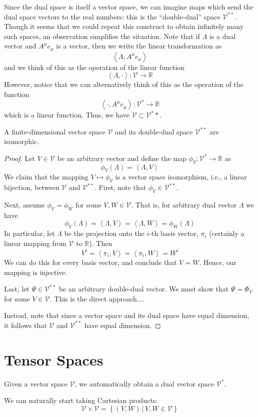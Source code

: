 Since the dual space is itself a vector space, we can imagine maps which send the dual space vectors to the real numbers: this is the ``double-dual'' space $\mathcal{V}^{**}$. Though it seems that we could repeat this construct to obtain infinitely many such spaces, an observation simplifies the situation. Note that if $\Lambda$ is a dual vector and $A^{\mu}e_{\mu}$ is a vector, then we write the linear transformation as \[ \left\langle \Lambda, A^{\mu}e_{\mu}\right\rangle \] and we think of this as the operation of the linear function \[ \left\langle \Lambda, \cdot \right\rangle : \mathcal{V} \rightarrow \mathbb{R} \] However, notice that we can alternatively think of this as the operation of the function \[ \left\langle \cdot, A^{\mu}e_{\mu} \right\rangle: \mathcal{V}^* \rightarrow \mathbb{R} \] which is a linear function. Thus, we have $\mathcal{V} \subset \mathcal{V}^**$.

\begin{theorem}
A finite-dimensional vector space $\mathcal{V}$ and its double-dual space $\mathcal{V}^{**}$ are isomorphic.
\end{theorem}
\begin{proof}
Let $V\in \mathcal{V}$ be an arbitrary vector and define the map $\phi_V: \mathcal{V}^* \rightarrow \mathbb{R}$ as \[ \phi_{V} \left(\Lambda\right) = \left\langle \Lambda, V \right\rangle \] We claim that the mapping $V \mapsto \phi_V$ is a vector space isomorphism, i.e., a linear bijection, between $\mathcal{V}$ and $\mathcal{V}^{**}$. First, note that $\phi_V \in \mathcal{V}^{**}$.

Next, assume $\phi_V = \phi_W$ for some $V, W \in \mathcal{V}$. That is, for arbitrary dual vector $\Lambda$ we have \[ \phi_V\left(\Lambda\right) = \left\langle \Lambda, V \right\rangle = \left\langle \Lambda, W \right\rangle = \phi_W\left(\Lambda\right) \] In particular, let $\Lambda$ be the projection onto the $i$-th basis vector, $\pi_i$ (certainly a linear mapping from $\mathcal{V}$ to $\mathbb{R}$). Then \[ V^i = \left\langle \pi_i, V\right\rangle = \left\langle \pi_i, W\right\rangle = W^i \] We can do this for every basis vector, and conclude that $V=W$. Hence, our mapping is injective.

Last, let $\Psi \in \mathcal{V}^{**}$ be an arbitrary double-dual vector. We must show that $\Psi = \Phi_V$ for some $V \in \mathcal{V}$. This is the direct approach....

Instead, note that since a vector space and its dual space have equal dimension, it follows that $\mathcal{V}$ and $\mathcal{V}^{**}$ have equal dimension.
\end{proof}







\chapter{Tensor Spaces}

Given a vector space $\mathcal{V}$, we automatically obtain a dual vector space $\mathcal{V}^*$.

We can naturally start taking Cartesian products:\[ \mathcal{V}\times \mathcal{V} = \left\{ \left(V,W\right) \, | \, V,W \in \mathcal{V}\right\} \]












